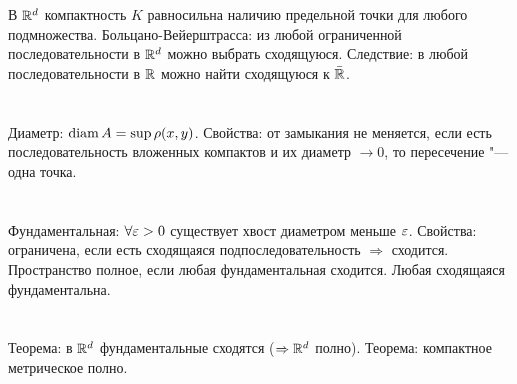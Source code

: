 \section{} %
В $\mathbb{R}^d$ компактность $K$ равносильна наличию предельной точки для любого подмножества.
Больцано-Вейерштрасса: из любой ограниченной последовательности в $\mathbb{R}^d$ можно
выбрать сходящуюся.
Следствие: в любой последовательности в $\mathbb{R}$ можно найти сходящуюся к $\bar {\mathbb{R}}$.

\section{} %
Диаметр: $\operatorname{diam} A = \sup \rho(x, y)$. Свойства: от замыкания не меняется, если есть последовательность
вложенных компактов и их диаметр $\to 0$, то пересечение "--- одна точка.

\section{} %
Фундаментальная: $\forall \varepsilon > 0$ существует хвост диаметром меньше $\varepsilon$. Свойства:
ограничена, если есть сходящаяся подпоследовательность $\Rightarrow$ сходится.
Пространство полное, если любая фундаментальная сходится. Любая сходящаяся фундаментальна.

\section{} %
Теорема: в $\mathbb{R}^d$ фундаментальные сходятся ($\Rightarrow \mathbb{R}^d$ полно). Теорема: компактное
метрическое полно.
